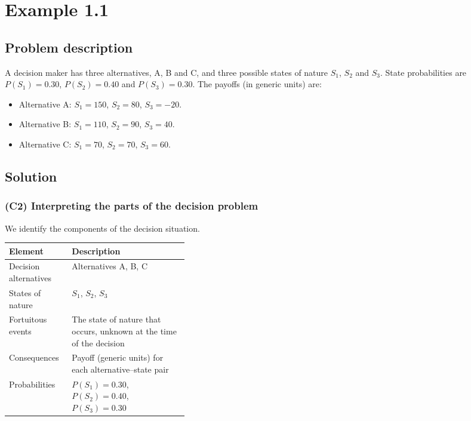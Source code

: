 \section{Example 1.1}\label{sec:example1-1}

\subsection{Problem description}\label{subsec:example1-1-problem}

A decision maker has three alternatives, A, B and C, and three possible states of nature \(S_1\), \(S_2\) and \(S_3\).
State probabilities are \(P(S_1)=0.30\), \(P(S_2)=0.40\) and \(P(S_3)=0.30\).
The payoffs (in generic units) are:

\begin{itemize}
	\item Alternative A: \(S_1=150\), \(S_2=80\), \(S_3=-20\).
	\item Alternative B: \(S_1=110\), \(S_2=90\), \(S_3=40\).
	\item Alternative C: \(S_1=70\), \(S_2=70\), \(S_3=60\).
\end{itemize}

\subsection{Solution}\label{subsec:example1-1-solution}

\subsubsection{(C2) Interpreting the parts of the decision problem}\label{subsubsec:example1-1-c2}

We identify the components of the decision situation.

\begin{center}
	\begin{tabularx}{\linewidth}{@{}L{0.35\linewidth}Y@{}}
		\toprule
		Element & Description \\
		\midrule
		Decision alternatives & Alternatives A, B, C \\
		States of nature & \(S_1\), \(S_2\), \(S_3\) \\
		Fortuitous events & The state of nature that occurs, unknown at the time of the decision \\
		Consequences & Payoff (generic units) for each alternative--state pair \\
		Probabilities & \(P(S_1)=0.30\), \(P(S_2)=0.40\), \(P(S_3)=0.30\) \\
		\bottomrule
	\end{tabularx}
\end{center}

